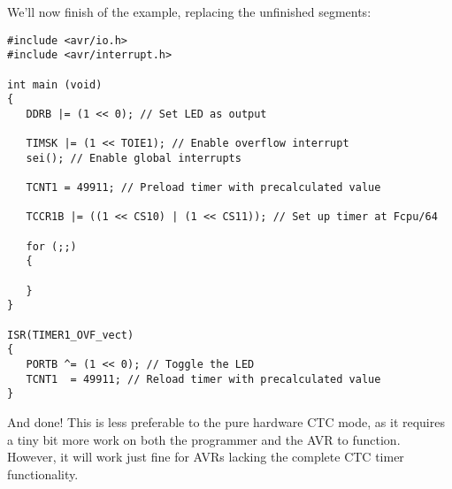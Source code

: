 \documentclass[a4paper,oneside,notitlepage]{book}
\begin{document}
We'll now finish of the example, replacing the unfinished segments:

\begin{center}
\begin{lstlisting}
#include <avr/io.h>
#include <avr/interrupt.h>

int main (void)
{
   DDRB |= (1 << 0); // Set LED as output

   TIMSK |= (1 << TOIE1); // Enable overflow interrupt
   sei(); // Enable global interrupts

   TCNT1 = 49911; // Preload timer with precalculated value

   TCCR1B |= ((1 << CS10) | (1 << CS11)); // Set up timer at Fcpu/64

   for (;;)
   {

   }
}

ISR(TIMER1_OVF_vect)
{
   PORTB ^= (1 << 0); // Toggle the LED
   TCNT1  = 49911; // Reload timer with precalculated value
}
\end{lstlisting}
\end{center}

And done! This is less preferable to the pure hardware CTC mode, as it requires a tiny bit more work on both the programmer and the AVR to function. However, it will work just fine for AVRs lacking the complete CTC timer functionality.
\end{document}
